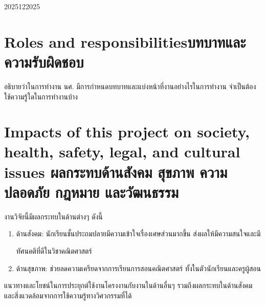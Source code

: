 \begin{plan}{6}{2025}{12}{2025}
\end{plan}

\section{\ifenglish Roles and responsibilities\else บทบาทและความรับผิดชอบ\fi}
อธิบายว่าในการทำงาน นศ. มีการกำหนดบทบาทและแบ่งหน้าที่งานอย่างไรในการทำงาน จำเป็นต้องใช้ความรู้ใดในการทำงานบ้าง

\section{\ifenglish%
Impacts of this project on society, health, safety, legal, and cultural issues
\else%
ผลกระทบด้านสังคม สุขภาพ ความปลอดภัย กฎหมาย และวัฒนธรรม
\fi}
งานวิจัยนี้มีผลกระทบในด้านต่างๆ ดังนี้
\begin{enumerate}
    \item ด้านสังคม: นักเรียนชั้นประถมปลายมีความเข้าใจเรื่องเศษส่วนมากขึ้น ส่งผลให้มีความสนใจและมี
    
    ทัศนคติที่ดีในวิชาคณิตศาสตร์
    \item ด้านสุขภาพ: ช่วยลดความเครียดจากการเรียนการสอนคณิตศาสตร์ ทั้งในตัวนักเรียนและครูผู้สอน
\end{enumerate}

แนวทางและโยชน์ในการประยุกต์ใช้งานโครงงานกับงานในด้านอื่นๆ รวมถึงผลกระทบในด้านสังคมและสิ่งแวดล้อมจากการใช้ความรู้ทางวิศวกรรมที่ได้
